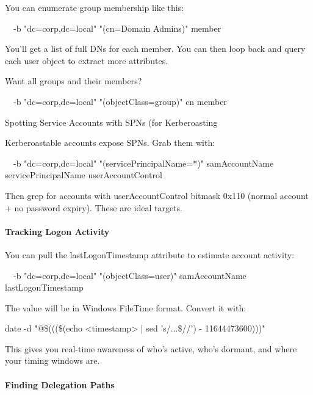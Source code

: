 You can enumerate group membership like this:


  -b "dc=corp,dc=local" "(cn=Domain Admins)" member

You’ll get a list of full DNs for each member. You can then loop back and query each user object to extract more attributes.

Want all groups and their members?


  -b "dc=corp,dc=local" "(objectClass=group)" cn member

Spotting Service Accounts with SPNs (for Kerberoasting

Kerberoastable accounts expose SPNs. Grab them with:


  -b "dc=corp,dc=local" "(servicePrincipalName=*)" samAccountName servicePrincipalName userAccountControl

Then grep for accounts with userAccountControl bitmask 0x110 (normal account + no password expiry). These are ideal targets.

\paragraph{\textbf{   Tracking Logon Activity}}

You can pull the lastLogonTimestamp attribute to estimate account activity:


  -b "dc=corp,dc=local" "(objectClass=user)" samAccountName lastLogonTimestamp

The value will be in Windows FileTime format. Convert it with:

date -d "@\$(((\$(echo <timestamp> | sed 's/...\$//') - 11644473600)))"

This gives you real-time awareness of who's active, who's dormant, and where your timing windows are.

\paragraph{\textbf{Finding Delegation Paths}}

